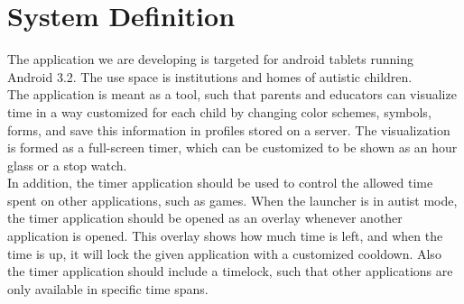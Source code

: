 \chapter{System Definition}
The application we are developing is targeted for android tablets running Android 3.2. The use space is institutions and homes of autistic children.\\
   The application is meant as a tool, such that parents and educators can visualize time in a way customized for each child by changing color schemes, symbols, forms, and save this information in profiles stored on a server. The visualization is formed as a full-screen timer, which can be customized to be shown as an hour glass or a stop watch.\\
  In addition, the timer application should be used to control the allowed time spent on other applications, such as games. When the launcher is in autist mode, the timer application should be opened as an overlay whenever another application is opened. This overlay shows how much time is left, and when the time is up, it will lock the given application with a customized cooldown. Also the timer application should include a timelock, such that other applications are only available in specific time spans.